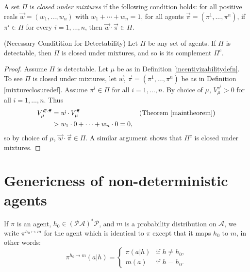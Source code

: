 \documentclass[runningheads]{llncs}
\begin{document}
\begin{definition}
\label{mixtureclosuredef}
    A set $\Pi$ is \emph{closed under mixtures} if the following
    condition holds: for all positive reals $\vec w=(w_1,\ldots,w_n)$
    with $w_1+\cdots+w_n=1$,
    for all agents $\vec\pi=(\pi^1,\ldots,\pi^n)$,
    if $\pi^i\in \Pi$ for every $i=1,\ldots,n$, then
    $\vec w\cdot\vec\pi\in\Pi$.
\end{definition}

\begin{theorem}
\label{closuretheorem}
    (Necessary Conditition for Detectability)
    Let $\Pi$ be any set of agents.
    If $\Pi$ is detectable, then $\Pi$ is closed under mixtures, and so
    is its complement $\Pi^c$.
\end{theorem}

\begin{proof}
    Assume $\Pi$ is detectable.
    Let $\mu$ be as in
    Definition \ref{incentivizabilitydefn}.
    To see $\Pi$ is closed under mixtures, let $\vec w$, $\vec\pi=(\pi^1,\ldots,\pi^n)$ be
    as in Definition \ref{mixtureclosuredef}.
    Assume $\pi^i\in\Pi$ for all $i=1,\ldots,n$.
    By choice of $\mu$, $V^{\pi^i}_\mu>0$ for all $i=1,\ldots,n$.
    Thus
    \begin{align*}
        V^{\vec w\cdot\vec\pi}_\mu
            &= \vec w\cdot V^{\vec\pi}_\mu
                &\mbox{(Theorem \ref{maintheorem})}\\
            &> w_1\cdot 0 + \cdots + w_n\cdot 0 = 0,
    \end{align*}
    so by choice of $\mu$, $\vec w\cdot \vec\pi\in \Pi$.
    A similar argument shows that $\Pi^c$ is closed under mixtures.
\end{proof}


\section{Genericness of non-deterministic agents}

\begin{definition}
\label{modifyagentatoneplace}
    If $\pi$ is an agent, $h_0\in(\mathcal P\mathcal A)^*\mathcal P$,
    and $m$ is a probability distribution on $\mathcal A$,
    we write $\pi^{h_0\mapsto m}$ for the agent which is identical to $\pi$
    except that it maps $h_0$ to $m$, in other words:
    \[
        \pi^{h_0\mapsto m}(a|h)
        =
        \begin{cases}
            \pi(a|h) &\mbox{if $h\not=h_0$,}\\
            m(a) &\mbox{if $h=h_0$.}
        \end{cases}
    \]
\end{definition}
\end{document}
